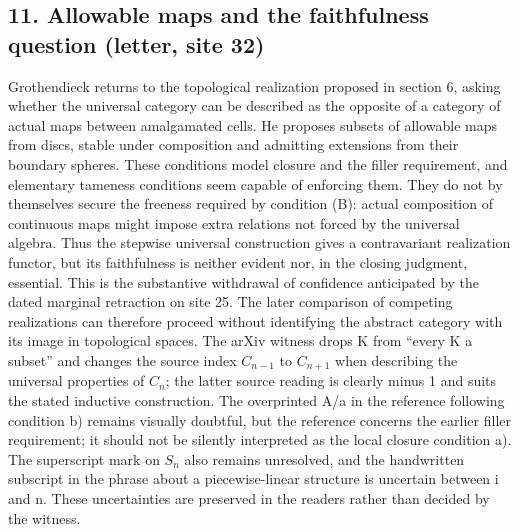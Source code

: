 \subsection*{11. Allowable maps and the faithfulness question (letter, site 32)}
Grothendieck returns to the topological realization proposed in section 6, asking whether the universal category can be described as the opposite of a category of actual maps between amalgamated cells. He proposes subsets of allowable maps from discs, stable under composition and admitting extensions from their boundary spheres. These conditions model closure and the filler requirement, and elementary tameness conditions seem capable of enforcing them. They do not by themselves secure the freeness required by condition (B): actual composition of continuous maps might impose extra relations not forced by the universal algebra. Thus the stepwise universal construction gives a contravariant realization functor, but its faithfulness is neither evident nor, in the closing judgment, essential. This is the substantive withdrawal of confidence anticipated by the dated marginal retraction on site 25. The later comparison of competing realizations can therefore proceed without identifying the abstract category with its image in topological spaces. The arXiv witness drops K from ``every K a subset'' and changes the source index $C_{n-1}$ to $C_{n+1}$ when describing the universal properties of $C_n$; the latter source reading is clearly minus 1 and suits the stated inductive construction. The overprinted A/a in the reference following condition b) remains visually doubtful, but the reference concerns the earlier filler requirement; it should not be silently interpreted as the local closure condition a). The superscript mark on $S_n$ also remains unresolved, and the handwritten subscript in the phrase about a piecewise-linear structure is uncertain between i and n. These uncertainties are preserved in the readers rather than decided by the witness.

